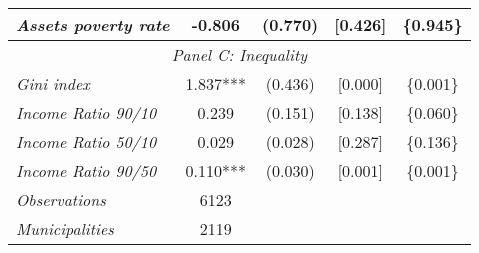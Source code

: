 \begin{tabular}{lcccc}
\textit{Assets poverty rate}  &  -0.806  
					   & (0.770) 
					   &  [0.426]  
					   & \{0.945\} \\[0.2cm]

\midrule                                                                                      
\multicolumn{5}{c}{\textit{Panel  C: Inequality}}   \\[0.2cm]  

\textit{Gini index}  &  1.837***  
					   & (0.436) 
					   & [0.000]  
					   & \{0.001\} \\[0.2cm]
					   
\textit{Income Ratio 90/10}  &  0.239  
					   & (0.151) 
					   & [0.138]  
					   & \{0.060\} \\[0.2cm]
					   
\textit{Income Ratio 50/10}  &  0.029  
					   & (0.028) 
					   & [0.287]  
					   & \{0.136\} \\[0.2cm]
					   
\textit{Income Ratio 90/50}  &  0.110***  
					   & (0.030) 
					   & [0.001]  
					   & \{0.001\} \\[0.2cm]
					   

\midrule

\textit{Observations} 	  &   6123	\\[0.2cm]
\textit{Municipalities}   &   2119   \\[0.2cm]

\bottomrule

\end{tabular}%

